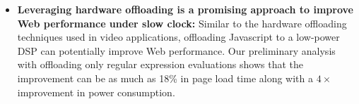 \begin{itemize}

 \item {\bf Leveraging hardware offloading is a promising approach to improve Web performance under slow clock:}  Similar to the hardware offloading techniques used in video applications, offloading Javascript to a low-power DSP can potentially improve Web performance. Our preliminary 
 analysis with offloading only regular expression evaluations
shows that the improvement can be as much as 18\% in page load time along with a $4\times$ 
improvement in power consumption. %
\end{itemize}


